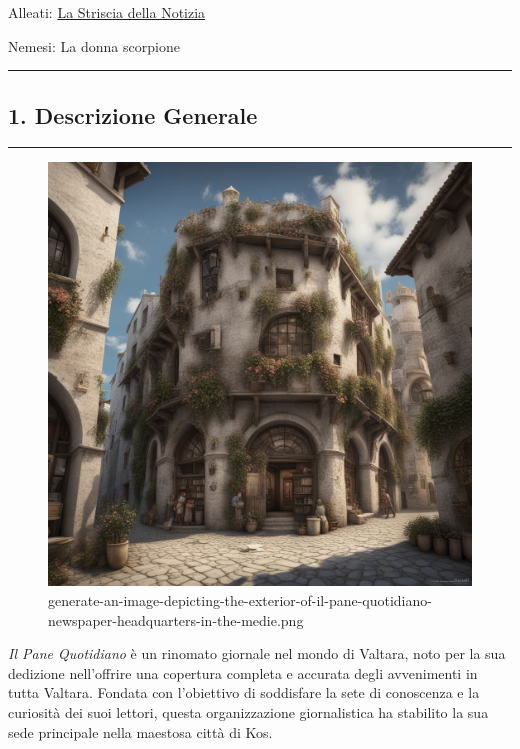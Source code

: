 Alleati:
\href{La\%20Striscia\%20della\%20Notizia\%20c8a28097b17441cf8bf5943cbc38334d.md}{La
Striscia della Notizia}

Nemesi: La donna scorpione

\begin{center}\rule{0.5\linewidth}{0.5pt}\end{center}

\subsection{1. Descrizione Generale}\label{descrizione-generale}

\begin{center}\rule{0.5\linewidth}{0.5pt}\end{center}

\begin{figure}
\centering
\includegraphics{generate-an-image-depicting-the-exterior-of-il-pane-quotidiano-newspaper-headquarters-in-the-medie.png}
\caption{generate-an-image-depicting-the-exterior-of-il-pane-quotidiano-newspaper-headquarters-in-the-medie.png}
\end{figure}

\emph{Il Pane Quotidiano} è un rinomato giornale nel mondo di Valtara,
noto per la sua dedizione nell'offrire una copertura completa e accurata
degli avvenimenti in tutta Valtara. Fondata con l'obiettivo di
soddisfare la sete di conoscenza e la curiosità dei suoi lettori, questa
organizzazione giornalistica ha stabilito la sua sede principale nella
maestosa città di Kos.

